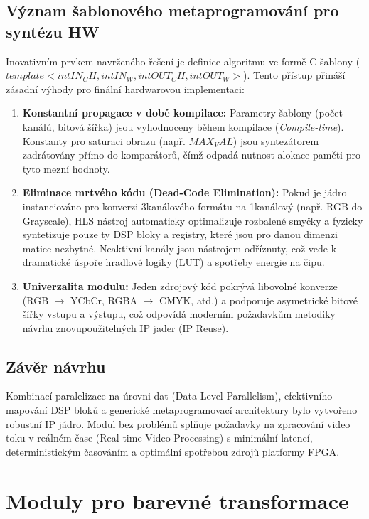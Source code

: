 \documentclass[FM,DP]{tulthesis}
\begin{document}
\subsection{Význam šablonového metaprogramování pro syntézu HW}
Inovativním prvkem navrženého řešení je definice algoritmu ve formě C\+\+
šablony ($template <int IN_CH, int IN_W, int OUT_CH, int OUT_W>$). Tento
přístup přináší zásadní výhody pro finální hardwarovou implementaci:

\begin{enumerate}
    \item \textbf{Konstantní propagace v době kompilace:} Parametry šablony (počet kanálů, bitová šířka) jsou vyhodnoceny během kompilace (\textit{Compile-time}). Konstanty pro saturaci obrazu (např. $MAX_VAL$) jsou syntezátorem zadrátovány přímo do komparátorů, čímž odpadá nutnost alokace paměti pro tyto mezní hodnoty.
    \item \textbf{Eliminace mrtvého kódu (Dead-Code Elimination):} Pokud je jádro instanciováno pro konverzi 3kanálového formátu na 1kanálový (např. RGB do Grayscale), HLS nástroj automaticky optimalizuje rozbalené smyčky a fyzicky syntetizuje pouze ty DSP bloky a registry, které jsou pro danou dimenzi matice nezbytné. Neaktivní kanály jsou nástrojem odříznuty, což vede k dramatické úspoře hradlové logiky (LUT) a spotřeby energie na čipu.
    \item \textbf{Univerzalita modulu:} Jeden zdrojový kód pokrývá libovolné konverze (RGB $\rightarrow$ YCbCr, RGBA $\rightarrow$ CMYK, atd.) a podporuje asymetrické bitové šířky vstupu a výstupu, což odpovídá moderním požadavkům metodiky návrhu znovupoužitelných IP jader (IP Reuse).
\end{enumerate}

\subsection{Závěr návrhu}
Kombinací paralelizace na úrovni dat (Data-Level Parallelism), efektivního
mapování DSP bloků a generické metaprogramovací architektury bylo vytvořeno
robustní IP jádro. Modul bez problémů splňuje požadavky na zpracování video
toku v reálném čase (Real-time Video Processing) s minimální latencí,
deterministickým časováním a optimální spotřebou zdrojů platformy FPGA.

\section{Moduly pro barevné transformace}
\end{document}
